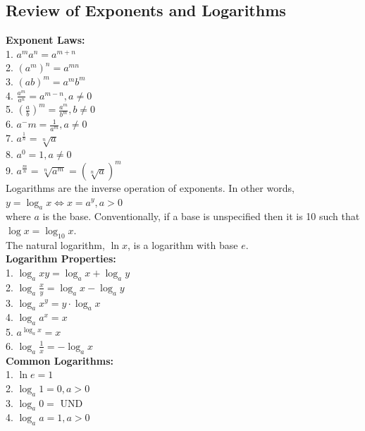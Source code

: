 \documentclass{article}
\begin{document}
    \subsection{Review of Exponents and Logarithms}

    \color{purple} \textbf{Exponent Laws:} \color{black} \\
    1. $a^ma^n=a^{m+n}$ \\
    2. $(a^m)^n=a^{mn}$ \\
    3. $(ab)^m=a^mb^m$ \\
    4. $\frac{a^m}{a^n}=a^{m-n},a\not=0$ \\
    5. $(\frac{a}{b})^m=\frac{a^m}{b^m},b\not=0$ \\
    6. $a^-m=\frac{1}{a^m},a\not=0$ \\
    7. $a^{\frac{1}{n}}=\sqrt[n]{a}$ \\
    8. $a^0=1,a\not=0$ \\
    9. $a^{\frac{m}{n}}=\sqrt[n]{a^m}=(\sqrt[n]{a})^m$ \\

    \noindent Logarithms are the inverse operation of exponents. In other words, \\
    $y=\log_ax\iff x=a^y, a>0$ \\
    where $a$ is the base. Conventionally, if a base is unspecified then it is 10 such that
    $\log x = \log _{10} x$. \\

    \noindent The natural logarithm, $\ln{x}$, is a logarithm with base $e$. \\

    \noindent \color{purple} \textbf{Logarithm Properties:} \color{black} \\
    1. $\log _a xy=\log _a x+\log _a y$ \\
    2. $\log _a \frac{x}{y}=\log _a x - \log _a y$ \\
    3. $\log _a x^y=y\cdot\log _a x$ \\
    4. $\log _a a^x=x$ \\
    5. $a^{\log _a x} = x$ \\
    6. $\log _a \frac{1}{x}=-\log _a {x}$ \\

    \noindent \color{purple} \textbf{Common Logarithms:} \color{black} \\
    1. $\ln{e}=1$ \\
    2. $\log _a {1}=0, a>0$ \\
    3. $\log _a {0} = $ UND \\
    4. $\log _a {a} = 1, a>0$
\end{document}
